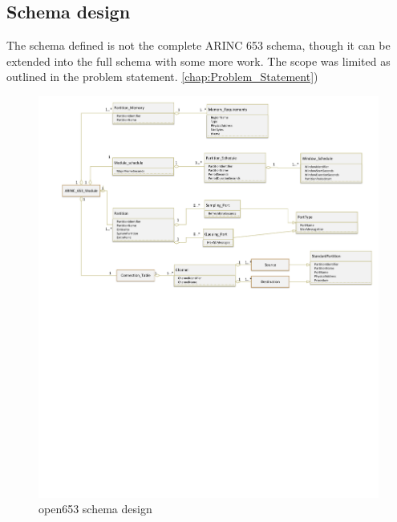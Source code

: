 \subsection{Schema design}

The schema defined is not the complete 
ARINC 653 schema, though it can be extended 
into the full schema with some more work. 
The scope was limited as outlined in the
problem statement. \ref{chap:Problem_Statement}) 

\begin{figure}[H]	\includegraphics[clip=true,trim=0cm 20cm 0cm 0cm,width=\linewidth,keepaspectratio]{figures/open653schema.pdf}
	\caption{open653 schema design}
	\label{fig:open653schema}
\end{figure}

